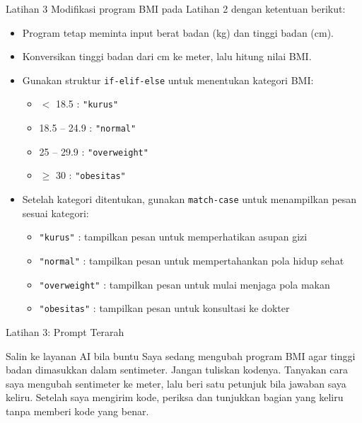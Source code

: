 \documentclass[aspectratio=169, table]{beamer}
\begin{document}
\begin{frame}[fragile,allowframebreaks=0.8]{Latihan 3}
\footnotesize
Modifikasi program BMI pada Latihan 2 dengan ketentuan berikut:
\begin{itemize}
    \item Program tetap meminta input berat badan (kg) dan tinggi badan (cm).
    \item Konversikan tinggi badan dari cm ke meter, lalu hitung nilai BMI.
    \item Gunakan struktur \texttt{if-elif-else} untuk menentukan kategori BMI:
    \begin{itemize}
        \item $<$ 18.5 : \texttt{"kurus"}
        \item 18.5 -- 24.9 : \texttt{"normal"}
        \item 25 -- 29.9 : \texttt{"overweight"}
        \item $\geq$ 30 : \texttt{"obesitas"}
    \end{itemize}
    \item Setelah kategori ditentukan, gunakan \texttt{match-case} untuk menampilkan pesan sesuai kategori:
    \begin{itemize}
        \item \texttt{"kurus"} : tampilkan pesan untuk memperhatikan asupan gizi
        \item \texttt{"normal"} : tampilkan pesan untuk mempertahankan pola hidup sehat
        \item \texttt{"overweight"} : tampilkan pesan untuk mulai menjaga pola makan
        \item \texttt{"obesitas"} : tampilkan pesan untuk konsultasi ke dokter
    \end{itemize}
\end{itemize}
\end{frame}

\begin{frame}{Latihan 3: Prompt Terarah}
\begin{block}{Salin ke layanan AI bila buntu}
\small Saya sedang mengubah program BMI agar tinggi badan dimasukkan dalam sentimeter. Jangan tuliskan kodenya. Tanyakan cara saya mengubah sentimeter ke meter, lalu beri satu petunjuk bila jawaban saya keliru. Setelah saya mengirim kode, periksa dan tunjukkan bagian yang keliru tanpa memberi kode yang benar.
\end{block}
\end{frame}
\end{document}
